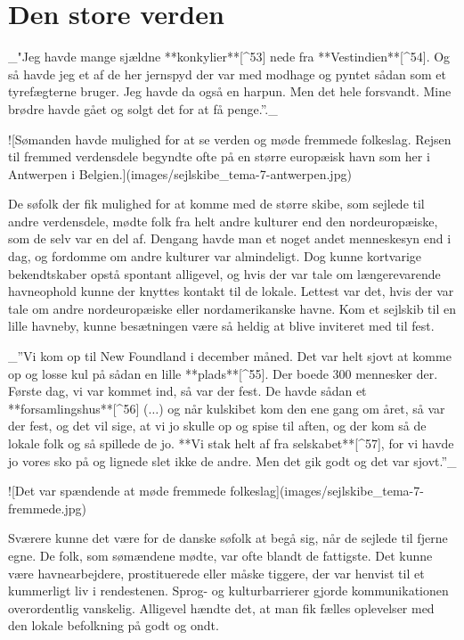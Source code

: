 \documentclass{book}
\begin{document}
\chapter{Den store verden}

 _"Jeg havde mange sjældne **konkylier**[^53] nede fra **Vestindien**[^54]. Og så havde jeg et af de her
 jernspyd der var med modhage og pyntet sådan som et tyrefægterne bruger. Jeg havde da
 også en harpun. Men det hele forsvandt. Mine brødre havde gået og solgt det for at få
 penge.”._

![Sømanden havde mulighed for at se verden og møde fremmede
folkeslag. Rejsen til fremmed verdensdele begyndte ofte på en større
europ\ae isk havn som her i Antwerpen i
Belgien.](images/sejlskibe_tema-7-antwerpen.jpg)

De søfolk der fik mulighed for at komme med de større skibe, som sejlede til andre
verdensdele, mødte folk fra helt andre kulturer end den nordeuropæiske, som de selv var en
del af. Dengang havde man et noget andet menneskesyn end i dag, og fordomme om andre
kulturer var almindeligt. Dog kunne kortvarige bekendtskaber opstå spontant alligevel, og
hvis der var tale om længerevarende havneophold kunne der knyttes kontakt til de lokale.
Lettest var det, hvis der var tale om andre nordeuropæiske eller nordamerikanske havne.
Kom et sejlskib til en lille havneby, kunne besætningen være så heldig at blive inviteret
med til fest.

 _”Vi kom op til New Foundland i december måned. Det var helt sjovt at komme op og losse kul
på sådan en lille **plads**[^55]. Der boede 300 mennesker der. Første dag, vi var kommet ind, så
var der fest. De havde sådan et **forsamlingshus**[^56] ($\ldots$) og når kulskibet kom den ene gang om
året, så var der fest, og det vil sige, at vi jo skulle op og spise til aften, og der kom
så de lokale folk og så spillede de jo. **Vi stak helt af fra selskabet**[^57], for vi havde jo
vores sko på og lignede slet ikke de andre. Men det gik godt og det var sjovt.”_

![Det var spændende at møde fremmede
folkeslag](images/sejlskibe_tema-7-fremmede.jpg)

Sværere kunne det være for de danske søfolk at
begå sig, når de sejlede til fjerne egne. De folk, som sømændene mødte, var ofte blandt de
fattigste. Det kunne være havnearbejdere, prostituerede eller måske tiggere, der var
henvist til et kummerligt liv i rendestenen. Sprog- og kulturbarrierer gjorde
kommunikationen overordentlig vanskelig. Alligevel hændte det, at man fik fælles
oplevelser med den lokale befolkning på godt og ondt.
\end{document}
